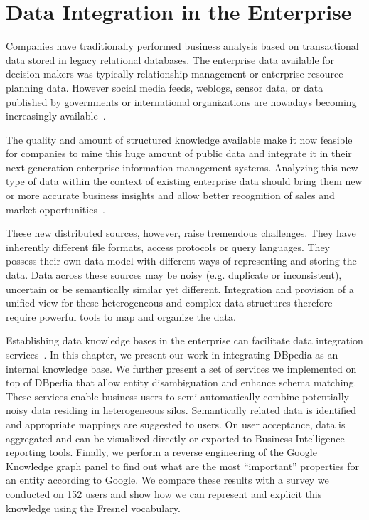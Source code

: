\chapter{Data Integration in the Enterprise}\label{chapter:rubix}
\graphicspath{{Part2/Chapter1/figures/}}

Companies have traditionally performed business analysis based on transactional data stored in legacy relational databases. The enterprise data available for decision makers was typically relationship management or enterprise resource planning data. However social media feeds, weblogs, sensor data, or data published by governments or international organizations are nowadays becoming increasingly available~\cite{Boyd:Article:11}.

The quality and amount of structured knowledge available make it now feasible for companies to mine this huge amount of public data and integrate it in their next-generation enterprise information management systems. Analyzing this new type of data within the context of existing enterprise data should bring them new or more accurate business insights and allow better recognition of sales and market opportunities~\cite{LaValle:MIT:11}.

These new distributed sources, however, raise tremendous challenges. They have inherently different file formats, access protocols or query languages. They possess their own data model with different ways of representing and storing the data. Data across these sources may be noisy (e.g. duplicate or inconsistent), uncertain or be semantically similar yet different. Integration and provision of a unified view for these heterogeneous and complex data structures therefore require powerful tools to map and organize the data.

Establishing data knowledge bases in the enterprise can facilitate data integration services~\cite{Frischmuth:SemWebJorunal:12}. In this chapter, we present our work in integrating DBpedia as an internal knowledge base. We further present a set of services we implemented on top of DBpedia that allow entity disambiguation and enhance schema matching. These services enable business users to semi-automatically combine potentially noisy data residing in heterogeneous silos. Semantically related data is identified and appropriate mappings are suggested to users. On user acceptance, data is aggregated and can be visualized directly or exported to Business Intelligence reporting tools. Finally, we perform a reverse engineering of the Google Knowledge graph panel to find out what are the most ``important'' properties for an entity according to Google. We compare these results with a survey we conducted on 152 users and show how we can represent and explicit this knowledge using the Fresnel vocabulary.

